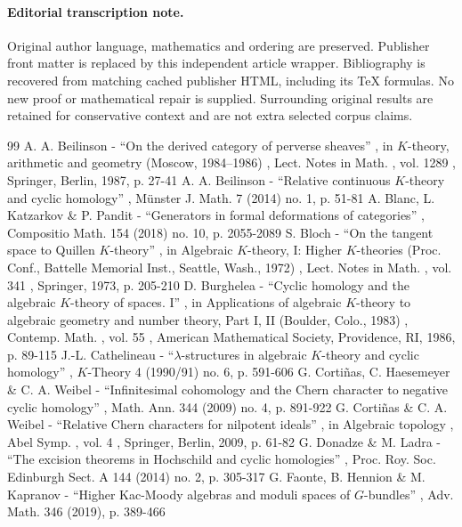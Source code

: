 \documentclass[11pt]{article}
\begin{document}
\paragraph{Editorial transcription note.}
Original author language, mathematics and ordering are preserved. Publisher front matter is replaced by this independent article wrapper. Bibliography is recovered from matching cached publisher HTML, including its TeX formulas. No new proof or mathematical repair is supplied. Surrounding original results are retained for conservative context and are not extra selected corpus claims.
\clearpage

\begin{thebibliography}{99}
 A. A. Beilinson - “On the derived category of perverse sheaves” , in $K$-theory, arithmetic and geometry (Moscow, 1984–1986) , Lect. Notes in Math. , vol. 1289 , Springer, Berlin, 1987, p. 27-41
 A. A. Beilinson - “Relative continuous $K$-theory and cyclic homology” , Münster J. Math. 7 (2014) no. 1, p. 51-81
 A. Blanc, L. Katzarkov \& P. Pandit - “Generators in formal deformations of categories” , Compositio Math. 154 (2018) no. 10, p. 2055-2089
 S. Bloch - “On the tangent space to Quillen $K$-theory” , in Algebraic $K$-theory, I: Higher $K$-theories (Proc. Conf., Battelle Memorial Inst., Seattle, Wash., 1972) , Lect. Notes in Math. , vol. 341 , Springer, 1973, p. 205-210
 D. Burghelea - “Cyclic homology and the algebraic $K$-theory of spaces. I” , in Applications of algebraic $K$-theory to algebraic geometry and number theory, Part I, II (Boulder, Colo., 1983) , Contemp. Math. , vol. 55 , American Mathematical Society, Providence, RI, 1986, p. 89-115
 J.-L. Cathelineau - “$\lambda $-structures in algebraic $K$-theory and cyclic homology” , $K$-Theory 4 (1990/91) no. 6, p. 591-606
 G. Cortiñas, C. Haesemeyer \& C. A. Weibel - “Infinitesimal cohomology and the Chern character to negative cyclic homology” , Math. Ann. 344 (2009) no. 4, p. 891-922
 G. Cortiñas \& C. A. Weibel - “Relative Chern characters for nilpotent ideals” , in Algebraic topology , Abel Symp. , vol. 4 , Springer, Berlin, 2009, p. 61-82
 G. Donadze \& M. Ladra - “The excision theorems in Hochschild and cyclic homologies” , Proc. Roy. Soc. Edinburgh Sect. A 144 (2014) no. 2, p. 305-317
 G. Faonte, B. Hennion \& M. Kapranov - “Higher Kac-Moody algebras and moduli spaces of $G$-bundles” , Adv. Math. 346 (2019), p. 389-466

\end{thebibliography}
\end{document}
